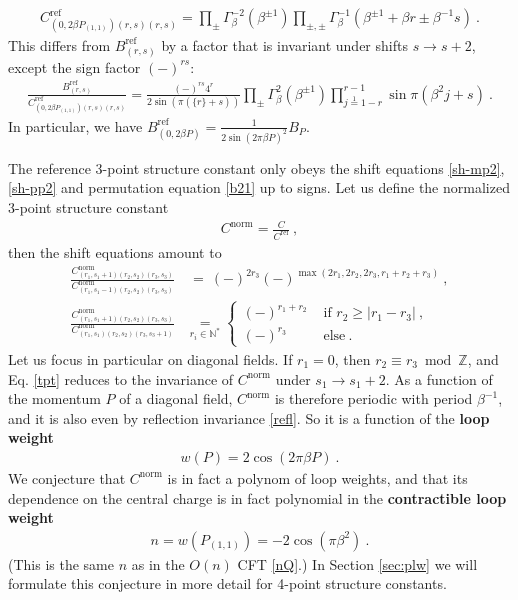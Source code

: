 \documentclass[12pt, a4paper]{article}
\newcommand{\myindex}[1]{\textbf{\boldmath #1}}
\begin{document}
 \begin{align}
  C^\text{ref}_{(0,2\beta P_{(1,1)})(r,s)(r,s)} =  \prod_\pm \Gamma_\beta^{-2}\left(\beta^{\pm 1}\right)\prod_{\pm,\pm}\Gamma_\beta^{-1}\left(\beta^{\pm 1}+\beta r \pm \beta^{-1}s\right)  \ .
  \label{cref0}
 \end{align}
This differs from $B^\text{ref}_{(r,s)}$ by a factor that is invariant under shifts $s\to s+2$, except the sign factor $(-)^{rs}$:
 \begin{align}
  \frac{B^\text{ref}_{(r,s)}}{C^\text{ref}_{(0,2\beta P_{(1,1)})(r,s)(r,s)}} = 
  \frac{(-)^{rs} 4^r}{2\sin\left(\pi(\{r\}+s)\right)}
  \prod_\pm \Gamma_\beta^{2}(\beta^{\pm 1})
  \prod_{j\overset{1}{=}1-r}^{r-1} \sin\pi(\beta^2j+s) \ .
 \end{align}
In particular, we have $B^\text{ref}_{(0,2\beta P)} = \frac{1}{2\sin(2\pi\beta P)^2}B_P$.

The reference 3-point structure constant only obeys the shift equations \eqref{sh-mp2}, \eqref{sh-pp2} and permutation equation \eqref{b21} up to signs. Let us define the normalized 3-point structure constant 
\begin{align}
 C^\text{norm} = \frac{C}{C^\text{ref}}\ , 
\end{align}
then the shift equations amount to \cite{nrj23}
\begin{align}
 \frac{C^\text{norm}_{(r_1,s_1+1)(r_2,s_2)(r_3,s_3)}}{C^\text{norm}_{(r_1,s_1-1)(r_2,s_2)(r_3,s_3)}} &\ =\  (-)^{2r_3}(-)^{\max(2r_1, 2r_2, 2r_3,r_1+r_2+r_3)} \ ,
 \label{tpt}
 \\
 \frac{C^\text{norm}_{(r_1,s_1+1)(r_2,s_2)(r_3,s_3)}}{C^\text{norm}_{(r_1,s_1)(r_2,s_2)(r_3,s_3+1)}} &\underset{r_i\in\mathbb{N}^*}{=} 
 \left\{\begin{array}{ll} (-)^{r_1+r_2} &\text{ if } r_2\geq |r_1-r_3|\ ,
                        \\ (-)^{r_3} &\text{ else}\ .
                       \end{array}\right. 
\label{tppt}
\end{align}
Let us focus in particular on diagonal fields. If $r_1=0$, then $r_2\equiv r_3\bmod\mathbb{Z}$, and Eq. \eqref{tpt} reduces to the invariance of $C^\text{norm}$ under $s_1\to s_1+2$. As a function of the momentum $P$ of a diagonal field, $C^\text{norm}$ is therefore periodic with period $\beta^{-1}$, and it is also even by reflection invariance \eqref{refl}. So it is a function of the \myindex{loop weight}
\begin{align}
 \boxed{w(P) = 2\cos(2\pi\beta P)}\ .
 \label{wP}
\end{align}
We conjecture that $C^\text{norm}$ is in fact a polynom of loop weights, and that its dependence on the central charge is in fact polynomial in the \myindex{contractible loop weight}
\begin{align}
 \boxed{n= w\left(P_{(1,1)}\right) = -2\cos(\pi \beta^2)} \ .
 \label{ncb}
\end{align}
(This is the same $n$ as in the $O(n)$ CFT \eqref{nQ}.) In Section \ref{sec:plw} we will formulate this conjecture in more detail for 4-point structure constants. 
\end{document}
